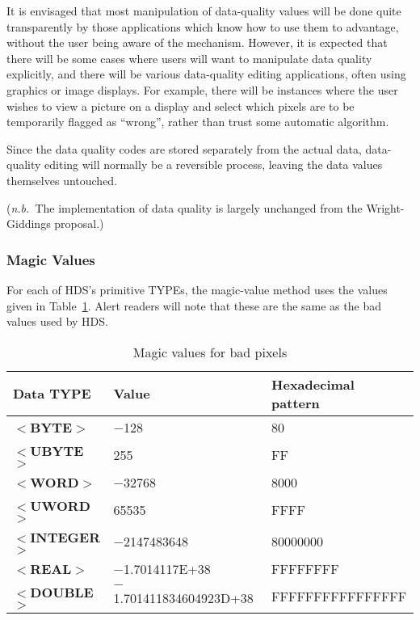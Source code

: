 \documentclass[twoside,11pt]{article}
\newcommand{\xlabel}[1]{}
\renewcommand{\_}{\texttt{\symbol{95}}}
\begin{document}
It is envisaged that most manipulation of data-quality values will be
done quite transparently by those applications which know how to use them
to advantage, without the user being aware of the mechanism.
However, it is expected that there will be some cases where
users will want to manipulate data quality explicitly, and there
will be various data-quality editing applications, often
using graphics or image displays.
For example, there will be instances where the user wishes to
view a picture on a display and select which pixels are to
be temporarily flagged as ``wrong'', rather than trust some automatic
algorithm.

Since the data quality codes are stored separately from the actual data,
data-quality editing will normally be a reversible process, leaving
the data values themselves untouched.

({\it n.b.}\ The implementation of data quality is
largely unchanged from the
Wright-Giddings proposal.)

\subsubsection{\xlabel{se_impmagic}Magic Values\label{se:impmagic}}

For each of HDS's primitive TYPEs, the
magic-value method uses the values given in Table~\ref{ta:magicvalues}.
Alert readers will note that these are the
same as the bad values used by HDS.

\begin{table}[htb]
\centering
\caption{Magic values for bad pixels}
\label{ta:magicvalues}
\begin{tabular}{|l|l|l|}
\hline
Data TYPE & Value & Hexadecimal pattern \\ \hline
$<${\bf \_BYTE}$>$ & $-$128 & 80 \\
$<${\bf \_UBYTE}$>$ & \hspace{0.8em}255 & FF \\
$<${\bf \_WORD}$>$ & $-$32768 & 8000 \\
$<${\bf \_UWORD}$>$ & \hspace{0.8em}65535 & FFFF \\
$<${\bf \_INTEGER}$>$ & $-$2147483648 & 80000000 \\
$<${\bf \_REAL}$>$ & $-$1.7014117E+38 & FFFFFFFF \\
$<${\bf \_DOUBLE}$>$ & $-$1.701411834604923D+38 & FFFFFFFFFFFFFFFF \\ \hline
\end{tabular}
\end{table}
\end{document}
